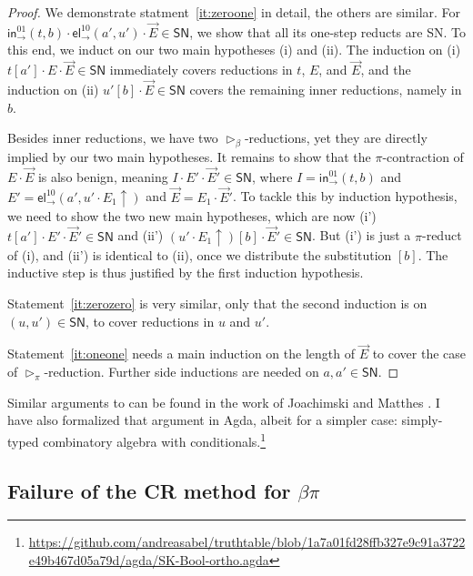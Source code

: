\documentclass[a4paper,USenglish,cleveref, autoref, thm-restate]{lipics-v2021}
\newcommand{\tin}{\ensuremath{\mathsf{in}}}
\newcommand{\inn}[2]{\ensuremath{\tin_{#1}^{#2}}}
\newcommand{\tel}{\mathsf{el}}
\newcommand{\el}[2]{\ensuremath{\tel_{#1}^{#2}}}
\newcommand{\whd}[1][]{\rhd_{#1}}
\newcommand{\SN}{\mathsf{SN}}
\begin{document}
\begin{proof}
  We demonstrate statment~\ref{it:zeroone} in detail, the others are similar.
  For $\inn\to{01}(t,b) \cdot \el\to{10}(a',u') \cdot \vec E \in \SN$,
  we show that all its one-step reducts are SN.
  To this end, we induct on
  our two main hypotheses (i) and (ii).
  The induction on (i)
  $t[a'] \cdot E \cdot \vec E \in \SN$ immediately covers
  reductions in $t$, $E$, and $\vec E$,
  and the induction on (ii)
  $u'[b] \cdot \vec E \in \SN$ covers the remaining inner
  reductions, namely in $b$.

  Besides inner reductions, we have two $\whd[\beta]$-reductions, yet they
  are directly implied by our two main hypotheses.  It remains to show that the
  $\pi$-contraction of $E \cdot \vec E$ is also benign, meaning $I \cdot
  E' \cdot \vec E' \in \SN$,
  where $I = \inn\to{01}(t,b)$ and
  $E' = \el\to{10}(a', u' \cdot E_1\uparrow)$ and
  $\vec E = E_1 \cdot \vec E'$.
  To tackle this by induction hypothesis, we
  need to show the two new main hypotheses, which are now
  (i') $t[a'] \cdot E' \cdot \vec E' \in \SN$ and
  (ii') $(u' \cdot E_1\uparrow)[b] \cdot \vec E' \in \SN$.
  But (i') is just a $\pi$-reduct of (i), and (ii') is identical to
  (ii), once we distribute the substitution $[b]$.
  The inductive step is thus justified by the first induction
  hypothesis.

  Statement~\ref{it:zerozero} is very similar, only that the second
  induction is on $(u,u') \in \SN$, to cover reductions in $u$ and
  $u'$.

  Statement~\ref{it:oneone} needs a main induction on the length of
  $\vec E$ to cover the case of $\whd[\pi]$-reduction.  Further side
  inductions are needed on $a,a' \in \SN$.
\end{proof}
Similar arguments to  can be found in the work of
Joachimski and Matthes \cite[Sect.~5 and 6]{matthes:shortproofs}.
I have also formalized that argument in Agda, albeit for a simpler
case: simply-typed combinatory algebra with conditionals.\footnote{\url{https://github.com/andreasabel/truthtable/blob/1a7a01fd28ffb327e9c91a3722e49b467d05a79d/agda/SK-Bool-ortho.agda}}

\subsection{Failure of the CR method for $\beta\pi$}
\end{document}
